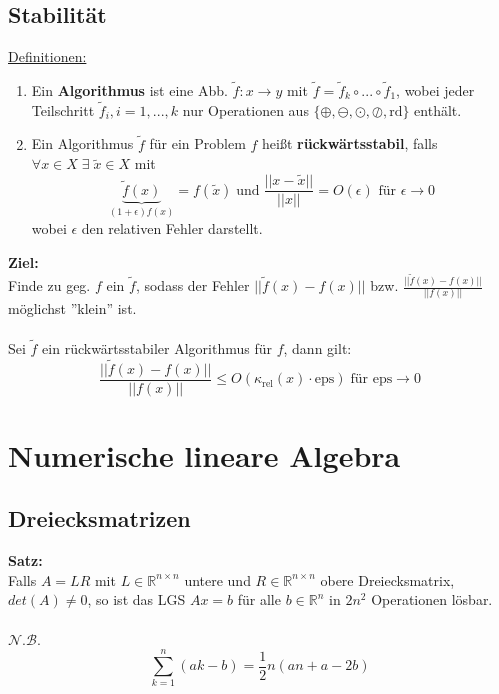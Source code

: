 \documentclass[4pt,a4paper]{scrartcl}
\begin{document}
\begin{multicols}{4}
\subsection{Stabilität}
\underline{Definitionen:}
\begin{enumerate}[label=$\bullet$]
\item Ein \textbf{Algorithmus} ist eine Abb. $\tilde{f}:x\rightarrow y$ mit $\tilde{f}=\tilde{f}_k\circ ...\circ \tilde{f}_1$, wobei jeder Teilschritt $\tilde{f}_i,i=1,...,k$ nur Operationen aus $\{\oplus ,\ominus,\odot,\oslash,\text{rd}\}$ enthält.
\item Ein Algorithmus $\tilde{f}$ für ein Problem $f$ heißt \textbf{rückwärtsstabil}, falls $\forall x\in X\;\exists\;\tilde{x}\in X$ mit
\begin{equation*}
\underbrace{\tilde{f}(x)}_{(1+\epsilon)f(x)}=f(\tilde{x})\;\text{und}\;\frac{||x-\tilde{x}||}{||x||} = O(\epsilon)\text{ für }\epsilon\rightarrow 0
\end{equation*}
wobei $\epsilon$ den relativen Fehler darstellt.
\end{enumerate}
\textbf{Ziel:}\\
Finde zu geg. $f$ ein $\tilde{f}$, sodass der Fehler $||\tilde{f}(x)-f(x)||$ bzw. $\frac{||\tilde{f}(x)-f(x)||}{||f(x)||}$ möglichst ''klein'' ist.\\\\
Sei $\tilde{f}$ ein rückwärtsstabiler Algorithmus für $f$, dann gilt:
\begin{equation*}
\frac{||\tilde{f}(x)-f(x)||}{||f(x)||}\leq O(\kappa_{\text{rel}}(x)\cdot \text{eps})\;\text{für eps}\rightarrow 0
\end{equation*}

\section{Numerische lineare Algebra}

\subsection{Dreiecksmatrizen}
\textbf{Satz:}\\
Falls $A=LR$ mit $L\in\mathbb{R}^{n\times n}$ untere und $R\in\mathbb{R}^{n\times n}$ obere Dreiecksmatrix, $det(A)\neq 0$, so ist das LGS $Ax=b$ für alle $b\in\mathbb{R}^n$ in $2n^2$ Operationen lösbar.\\\\
$\mathcal{N.B.}$
\begin{equation*}
\sum\limits_{k=1}^{n}(ak-b)=\frac{1}{2}n(an+a-2b)
\end{equation*}


\end{multicols}
\end{document}
